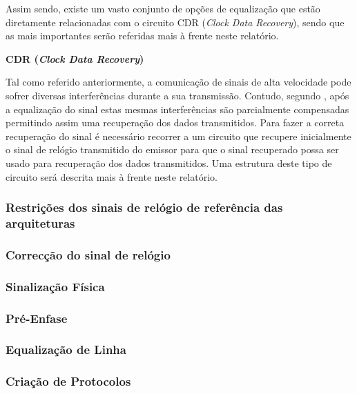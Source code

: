 	Assim sendo, existe um vasto conjunto de opções de equalização que estão diretamente relacionadas com o circuito CDR (\textit{Clock Data Recovery}), sendo que as mais importantes serão referidas mais à frente neste relatório. 

 \textbf{CDR (\textit{Clock Data Recovery})}
	
Tal como referido anteriormente, a comunicação de sinais de alta velocidade pode sofrer diversas interferências durante a sua transmissão. Contudo, segundo \cite{R012}, após a equalização do sinal estas mesmas interferências são parcialmente compensadas permitindo assim uma recuperação dos dados transmitidos.  Para fazer a correta recuperação do sinal é necessário recorrer a um circuito que recupere inicialmente o sinal de relógio transmitido do emissor para que o sinal recuperado possa ser usado para recuperação dos dados transmitidos. Uma estrutura deste tipo de circuito será descrita mais à frente neste relatório.


\subsubsection*{Restrições dos sinais de relógio de referência das arquiteturas}

\subsubsection*{Correcção do sinal de relógio}

\subsubsection*{Sinalização Física}
\subsubsection*{Pré-Enfase}
\subsubsection*{Equalização de Linha}
\subsubsection*{Criação de Protocolos}

